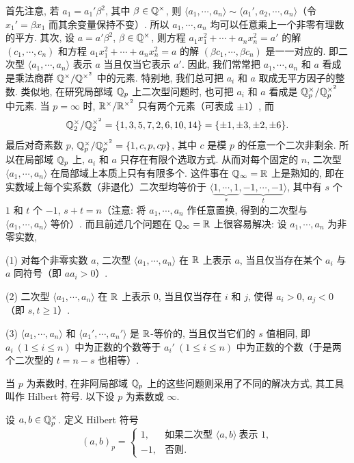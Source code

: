 首先注意, 若 $a_1=a_1'\beta^2$, 其中 $\beta\in\mathbb{Q}^{\times}$, 则 $\langle a_1,\cdots,a_n\rangle\sim\langle a_1',a_2,\cdots,a_n\rangle$（令 $x_1'=\beta x_1$ 而其余变量保持不变）. 所以 $a_1,\cdots,a_n$ 均可以任意乘上一个非零有理数的平方. 其次, 设 $a=a'\beta^2$, $\beta\in\mathbb{Q}^{\times}$, 则方程 $a_1x_1^2+\cdots+a_nx_n^2=a'$ 的解 $(c_1,\cdots,c_n)$ 和方程 $a_1x_1^2+\cdots+a_nx_n^2=a$ 的解 $(\beta c_1,\cdots,\beta c_n)$ 是一一对应的. 即二次型 $\langle a_1,\cdots,a_n\rangle$ 表示 $a$ 当且仅当它表示 $a'$. 因此, 我们常常把 $a_1,\cdots,a_n$ 和 $a$ 看成是乘法商群 $\mathbb{Q}^{\times}/\mathbb{Q}^{\times^2}$ 中的元素. 特别地, 我们总可把 $a_i$ 和 $a$ 取成无平方因子的整数. 类似地, 在研究局部域 $\mathbb{Q}_p$ 上二次型问题时, 也可把 $a_i$ 和 $a$ 看成是 $\mathbb{Q}_p^{\times}/\mathbb{Q}_p^{\times^2}$ 中元素. 当 $p=\infty$ 时, $\mathbb{R}^{\times}/\mathbb{R}^{\times^2}$ 只有两个元素（可表成 $\pm 1$）, 而
\[
  \mathbb{Q}_2^{\times}/\mathbb{Q}_2^{\times^2}=\{1,3,5,7,2,6,10,14\}=\{\pm 1,\pm 3,\pm 2,\pm 6\}.
\]
最后对奇素数 $p$, $\mathbb{Q}_p^{\times}/\mathbb{Q}_p^{\times^2}=\{1,c,p,cp\}$, 其中 $c$ 是模 $p$ 的任意一个二次非剩余. 所以在局部域 $\mathbb{Q}_p$ 上, $a_i$ 和 $a$ 只存在有限个选取方式. 从而对每个固定的 $n$, 二次型 $\langle a_1,\cdots,a_n\rangle$ 在局部域上本质上只有有限多个. 这件事在 $\mathbb{Q}_{\infty}=\mathbb{R}$ 上是熟知的, 即在实数域上每个实系数（非退化）二次型均等价于 $\langle\underbrace{1,\cdots,1}_{s},\underbrace{-1,\cdots,-1}_{t}\rangle$, 其中有 $s$ 个 $1$ 和 $t$ 个 $-1$, $s+t=n$（注意: 将 $a_1,\cdots,a_n$ 作任意置换, 得到的二次型与 $\langle a_1,\cdots,a_n\rangle$ 等价）. 而且前述几个问题在 $\mathbb{Q}_{\infty}=\mathbb{R}$ 上很容易解决: 设 $a_1,\cdots,a_n$ 为非零实数,

(1) 对每个非零实数 $a$, 二次型 $\langle a_1,\cdots,a_n\rangle$ 在 $\mathbb{R}$ 上表示 $a$, 当且仅当存在某个 $a_i$ 与 $a$ 同符号（即 $aa_i>0$）.

(2) 二次型 $\langle a_1,\cdots,a_n\rangle$ 在 $\mathbb{R}$ 上表示 $0$, 当且仅当存在 $i$ 和 $j$, 使得 $a_i>0$, $a_j<0$（即 $s,t\geqslant 1$）.

(3) $\langle a_1,\cdots,a_n\rangle$ 和 $\langle a_1',\cdots,a_n'\rangle$ 是 $\mathbb{R}$-等价的, 当且仅当它们的 $s$ 值相同, 即 $a_i\ (1\leqslant i\leqslant n)$ 中为正数的个数等于 $a_i'\ (1\leqslant i\leqslant n)$ 中为正数的个数（于是两个二次型的 $t=n-s$ 也相等）.

当 $p$ 为素数时, 在非阿局部域 $\mathbb{Q}_p$ 上的这些问题则采用了不同的解决方式, 其工具叫作 Hilbert 符号. 以下设 $p$ 为素数或 $\infty$.

\begin{definition}\label{def:ch9-3}
设 $a,b\in\mathbb{Q}_p^{\times}$. 定义 Hilbert 符号
\[
  (a,b)_p=\begin{cases}
    1, & \text{如果二次型 } \langle a,b\rangle\ \text{表示 } 1,\\
    -1, & \text{否则}.
  \end{cases}
\]
\end{definition}

